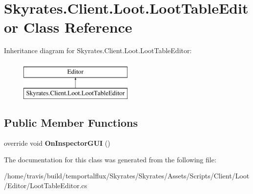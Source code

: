 \hypertarget{class_skyrates_1_1_client_1_1_loot_1_1_loot_table_editor}{\section{Skyrates.\-Client.\-Loot.\-Loot\-Table\-Editor Class Reference}
\label{class_skyrates_1_1_client_1_1_loot_1_1_loot_table_editor}
}
Inheritance diagram for Skyrates.\-Client.\-Loot.\-Loot\-Table\-Editor\-:\begin{figure}[H]
\begin{center}
\leavevmode
\includegraphics[height=2.000000cm]{class_skyrates_1_1_client_1_1_loot_1_1_loot_table_editor}
\end{center}
\end{figure}
\subsection*{Public Member Functions}
\begin{DoxyCompactItemize}
\item 
\hypertarget{class_skyrates_1_1_client_1_1_loot_1_1_loot_table_editor_a45893995dc273ca9bfb70ef85838bd33}{override void {\bfseries On\-Inspector\-G\-U\-I} ()}\label{class_skyrates_1_1_client_1_1_loot_1_1_loot_table_editor_a45893995dc273ca9bfb70ef85838bd33}

\end{DoxyCompactItemize}


The documentation for this class was generated from the following file\-:\begin{DoxyCompactItemize}
\item 
/home/travis/build/temportalflux/\-Skyrates/\-Skyrates/\-Assets/\-Scripts/\-Client/\-Loot/\-Editor/Loot\-Table\-Editor.\-cs\end{DoxyCompactItemize}
